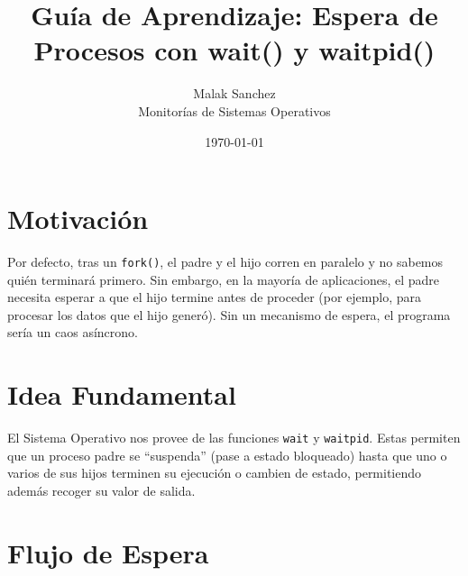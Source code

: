 \documentclass[12pt,a4paper]{article}
\title{\textbf{Guía de Aprendizaje: Espera de Procesos con wait() y waitpid()}}
\author{Malak Sanchez \\ \small Monitorías de Sistemas Operativos}
\date{\today}
\begin{document}
\maketitle

\section{Motivación}
Por defecto, tras un \texttt{fork()}, el padre y el hijo corren en paralelo y no sabemos quién terminará primero. Sin embargo, en la mayoría de aplicaciones, el padre necesita esperar a que el hijo termine antes de proceder (por ejemplo, para procesar los datos que el hijo generó). Sin un mecanismo de espera, el programa sería un caos asíncrono.

\section{Idea Fundamental}
El Sistema Operativo nos provee de las funciones \texttt{wait} y \texttt{waitpid}. Estas permiten que un proceso padre se ``suspenda'' (pase a estado bloqueado) hasta que uno o varios de sus hijos terminen su ejecución o cambien de estado, permitiendo además recoger su valor de salida.

\section{Flujo de Espera}
\begin{center}
\end{center}
\end{document}

